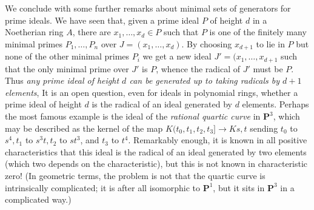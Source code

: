 \documentclass[10pt]{article}
\begin{document}
We conclude with some further remarks about minimal sets of generators
for prime ideals. We have seen that, given a prime ideal $P$ of height
$d$ in a Noetherian ring $A$, there are $x_1,\ldots,x_d\in P$ such that
$P$ is one of the finitely many minimal primes $P_1,\ldots,P_n$ over $J
= (x_1,\ldots,x_d)$. By choosing $x_{d+1}$ to lie in $P$ but none of the
other minimal primes $P_i$ we get a new ideal $J'= (x_1,\ldots,x_{d+1}$
such that the only minimal prime over $J'$ is $P$, whence the radical of
$J'$ must be $P$. Thus {\sl any prime ideal of height $d$ can be
  generated up to taking radicals by $d+1$ elements}, It is an open
question, even for ideals in polynomial rings, whether a prime ideal of
height $d$ is the radical of an ideal generated by $d$ elements. Perhaps
the most famous example is the ideal of the {\sl rational quartic curve}
in $\mathbf P^3$, which may be described as the kernel of the map
$K(t_0,t_1,t_2,t_3]\rightarrow K{s,t}$ sending $t_0$ to $s^4, t_1$ to
$s^3 t, t_2$ to $st^3$, and $t_3$ to $t^4$. Remarkably enough, it is
known in all positive characteristics that this ideal is the radical of
an ideal generated by two elements (which two depends on the
characteristic), but this is not known in characteristic zero! (In
geometric terms, the problem is not that the quartic curve is
intrinsically complicated; it is after all isomorphic to $\mathbf P^1$, but
it sits in $\mathbf P^3$ in a complicated way.)
\end{document}
